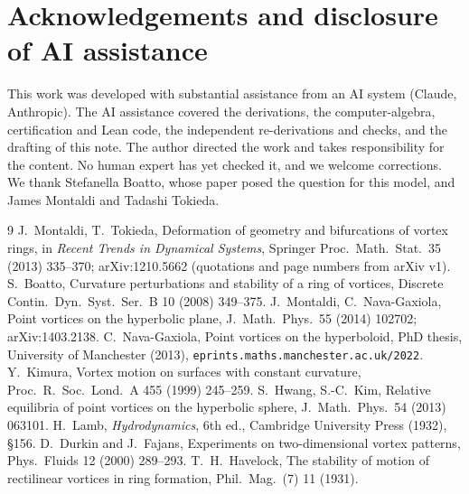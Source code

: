 \documentclass[11pt]{article}
\theoremstyle{remark}
\begin{document}
\section*{Acknowledgements and disclosure of AI assistance}
This work was developed with substantial assistance from an AI system (Claude, Anthropic). The AI assistance covered
the derivations, the computer-algebra, certification and Lean code, the independent re-derivations and checks,
and the drafting of this note. The author directed the work and takes responsibility for the content.
No human expert has yet checked it, and we welcome corrections. We thank Stefanella Boatto, whose paper posed the
question for this model, and James Montaldi and Tadashi Tokieda.

\begin{thebibliography}{9}
 J.~Montaldi, T.~Tokieda, Deformation of geometry and bifurcations of vortex rings, in
\emph{Recent Trends in Dynamical Systems}, Springer Proc.\ Math.\ Stat.\ 35 (2013) 335--370; arXiv:1210.5662
(quotations and page numbers from arXiv v1).
 S.~Boatto, Curvature perturbations and stability of a ring of vortices, Discrete Contin.\ Dyn.\ Syst.\
Ser.\ B 10 (2008) 349--375.
 J.~Montaldi, C.~Nava-Gaxiola, Point vortices on the hyperbolic plane, J.\ Math.\ Phys.\ 55
(2014) 102702; arXiv:1403.2138.
 C.~Nava-Gaxiola, Point vortices on the hyperboloid, PhD thesis, University of Manchester (2013),
\texttt{eprints.maths.manchester.ac.uk/2022}.
 Y.~Kimura, Vortex motion on surfaces with constant curvature, Proc.\ R.\ Soc.\ Lond.\ A 455
(1999) 245--259.
 S.~Hwang, S.-C.~Kim, Relative equilibria of point vortices on the hyperbolic sphere, J.\ Math.\ Phys.\ 54
(2013) 063101.
 H.~Lamb, \emph{Hydrodynamics}, 6th ed., Cambridge University Press (1932), \S156.
\bibitem{DF} D.~Durkin and J.~Fajans, Experiments on two-dimensional vortex patterns, Phys.\ Fluids 12 (2000) 289--293.
\bibitem{Havelock} T.~H.~Havelock, The stability of motion of rectilinear vortices in ring formation, Phil.\ Mag.\ (7) 11
(1931).
\end{thebibliography}
\end{document}
